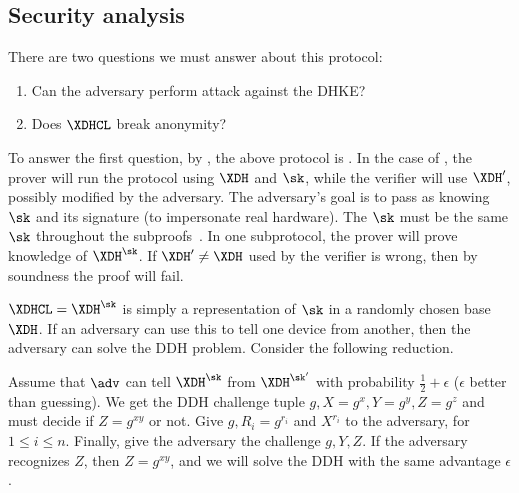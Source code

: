 \subsection{Security analysis}

There are two questions we must answer about this protocol:
\begin{enumerate}
  \item\label{DBSHW-MITM} Can the adversary perform  attack against 
    the \ac{DHKE}?
  \item\label{DBSHW-anon} Does \(\XDHCL\) break anonymity?
\end{enumerate}

To answer the first question, by \textcite{Camenisch-phdthesis}, the above 
protocol is .
In the case of , the prover will run the protocol using \(\XDH\) and 
\(\sk\), while the verifier will use \(\XDH'\), possibly modified by the 
adversary.
The adversary's goal is to pass as knowing \(\sk\) and its signature (to 
impersonate real hardware).
The \(\sk\) must be the same \(\sk\) throughout the 
subproofs~\cite{Camenisch-phdthesis}.
In one subprotocol, the prover will prove knowledge of \(\XDH^{\sk}\).
If \(\XDH' \neq \XDH\) used by the verifier is wrong, then by soundness the 
proof will fail.

\(\XDHCL = \XDH^{\sk}\) is simply a representation of \(\sk\) in a randomly 
chosen base~\(\XDH\).
If an adversary can use this to tell one device from another, then the 
adversary can solve the \ac{DDH} problem.
Consider the following reduction.

Assume that \(\adv\) can tell \(\XDH^{\sk}\) from \(\XDH^{\sk'}\) with 
probability \(\frac{1}{2} + \epsilon\) (\ie \(\epsilon\) better than guessing).
We get the \ac{DDH} challenge tuple \(g, X = g^x, Y = g^y, Z = g^z\) and must 
decide if \(Z = g^{xy}\) or not.
Give \(g, R_i = g^{r_i}\) and \(X^{r_i}\) to the adversary, for \(1\leq i\leq 
n\).
Finally, give the adversary the challenge \(g, Y, Z\).
If the adversary recognizes \(Z\), then \(Z = g^{xy}\), and we will solve the 
\ac{DDH} with the same advantage \(\epsilon\).
